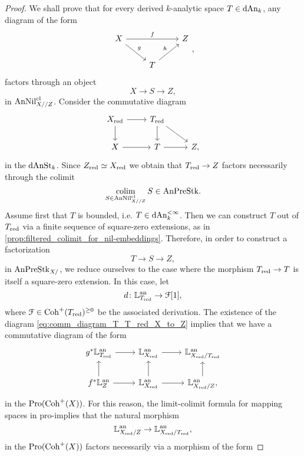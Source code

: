 \documentclass[10pt,a4paper,reqno]{amsart} %
\theoremstyle{plain}
\theoremstyle{definition}
\theoremstyle{remark}
\numberwithin{equation}{section}
\begin{document}
\begin{proof}
    We shall prove that for every derived $k$-analytic space $T \in \mathrm{dAn}_k$, any diagram of the form
        \[
        \begin{tikzcd}
            X \ar{rr}{f} \ar{rd}{g} & & Z \\
                & T \ar{ru}{h} &  
        \end{tikzcd},
        \]
    factors through an object
        \[
            X \to S \to Z,  
        \]
    in $\mathrm{AnNil}_{X/ /Z}^{\mathrm{cl}}$. Consider the commutative diagram
        \begin{equation} \label{eq:comm_diagram_T_T_red_X_to_Z}
        \begin{tikzcd}
            X_{\red} \ar{r} \ar{d} & T_\red \ar{d} \ar{dr} & \\
            X \ar{r} & T \ar{r} & Z,
        \end{tikzcd}
        \end{equation}
    in the \infcat $\mathrm{dAnSt}_k$. Since $Z_{\mathrm{red}} \simeq X_{\mathrm{red}}$ we obtain that $T_{\mathrm{red}} \to Z$ factors necessarily through the colimit
        \[
            \operatorname*{colim}_{S \in \mathrm{AnNil}^{\mathrm{cl}}_{X/ /Z}} S \in \mathrm{AnPreStk}.  
        \]
    Assume first that $T$ is bounded, i.e. $T \in \mathrm{dAn}_k^{< \infty}$. Then we can construct $T$ out of $T_{\mathrm{red}}$ via a finite sequence of square-zero extensions,
    as in \cref{prop:filtered_colimit_for_nil-embeddings}. Therefore, in order to construct
    a factorization
        \[
            T \to S \to Z,  
        \]
    in $\mathrm{AnPreStk}_{X/}$, we reduce ourselves to the case where the morphism $T_{\mathrm{red}} \to T$ is itself a square-zero extension.
    In this case, let
        \[
            d \colon \mathbb L^\mathrm{an}_{T_{\mathrm{red}}} \to \mathcal F[1],  
        \]
    where $\mathcal F \in \mathrm{Coh}^+(T_{\mathrm{red}})^{\ge 0}$ be the associated derivation. The existence of the diagram \eqref{eq:comm_diagram_T_T_red_X_to_Z} implies that
    we have a commutative diagram of the form
        \[
        \begin{tikzcd}
                g^*\bbL\an_{T_\red} \ar{r} & \bbL\an_{X_\red} \ar{r} & \bbL\an_{X_\red/ T_\red} \\
                f^* \bbL\an_{Z} \ar{r} \ar{u} & \bbL\an_{X_\red} \ar{u} \ar{r}& \bbL\an_{X_\red/ Z} \ar{u},
        \end{tikzcd}
        \]
    in the \infcat $\mathrm{Pro}(\mathrm{Coh}^+(X))$. For this reason, the limit-colimit formula for mapping spaces in pro-\infcats implies that the natural morphism
        \[
            \mathbb L^\mathrm{an}_{X_{\mathrm{red}}/ Z} \to \mathbb L^\mathrm{an}_{X_{\mathrm{red}}/ T_{\mathrm{red}}},
        \]
    in the \infcat $\mathrm{Pro}(\mathrm{Coh}^+(X))$ factors necessarily via a morphism of the form

\end{proof}
\end{document}
